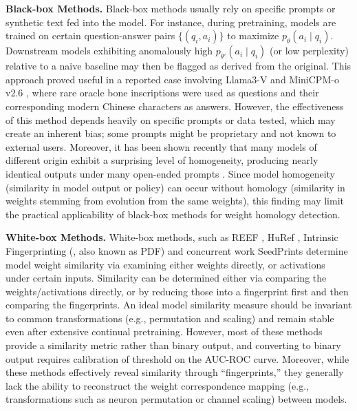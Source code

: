 \documentclass{article} %
\begin{document}
\textbf{Black-box Methods.} Black-box methods \citep{xu-etal-2024-instructional,pasquini2025llmmapfingerprintinglargelanguage} usually rely on specific prompts or synthetic text fed into the model. For instance, during pretraining, models are trained on certain question-answer pairs $\{(q_i, a_i)\}$ to maximize $p_\theta(a_i \mid q_i)$. Downstream models exhibiting anomalously high $p_{\theta'}(a_i \mid q_i)$ (or low perplexity) relative to a naive baseline may then be flagged as derived from the original. 
This approach proved useful in a reported case involving Llama3-V and MiniCPM-o v2.6 \citep{OpenBMB_MiniCPM_o_Issue196}, 
where rare oracle bone inscriptions were used as questions and their corresponding modern Chinese characters as answers. 
However, the effectiveness of this method depends heavily on specific prompts or data tested, which may create an inherent bias; some prompts might be proprietary and not known to external users. Moreover, it has been shown recently that many models of different origin exhibit a surprising level of homogeneity, producing nearly identical outputs under many open-ended prompts \citep{jiang2025artificial}. Since model homogeneity (similarity in model output or policy) can occur without homology (similarity in weights stemming from evolution from the same weights), this finding may limit the practical applicability of black-box methods for weight homology detection.

\textbf{White-box Methods.} White-box methods, such as REEF \citep{zhang2025reef}, HuRef \citep{zeng2024huref}, 
Intrinsic Fingerprinting (\citet{he2025upcyclinglargelanguagemodels}, also known as PDF) and concurrent work SeedPrints \citep{tong2025seedprintsfingerprintstellseed} determine model weight similarity via examining either weights directly, or activations under certain inputs. Similarity can be determined either via comparing the weights/activations directly, or by reducing those into a fingerprint first and then comparing the fingerprints. An ideal model similarity measure should be invariant to common transformations (e.g., permutation and scaling) and remain stable even after extensive continual pretraining. However, most of these methods provide a similarity metric rather than binary output, and converting to binary output requires calibration of threshold on the AUC-ROC curve. 
Moreover, while these methods effectively reveal similarity through ``fingerprints,'' they generally lack the ability to reconstruct the weight correspondence mapping (e.g., transformations such as neuron permutation or channel scaling) between models.
\end{document}
